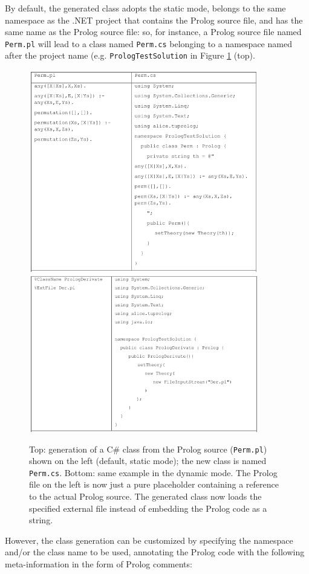 By default, the generated class adopts the static mode, belongs to the same namespace as the .NET project that contains the Prolog source file, and has the same name as the Prolog source file: so, for instance, a Prolog source file named \texttt{Perm.pl} will lead to a class named \texttt{Perm.cs} belonging to a namespace named after the project name (e.g. \texttt{PrologTestSolution} in Figure \ref{fig:dotnet-codegen1and2} (top).
%
\begin{figure}\center
  \includegraphics[width=10cm]{images/dotnet-codegen1}\\
  \includegraphics[width=10cm]{images/dotnet-codegen2}
  \caption{Top: generation of a C\# class from the Prolog source (\texttt{Perm.pl}) shown on the left (default, static mode); the new class is named \texttt{Perm.cs}.
  Bottom: same example in the dynamic mode. The Prolog file on the left is now just a pure placeholder containing a reference to the actual Prolog source. The generated class now loads the specified external file instead of embedding the Prolog code as a string.
  }\label{fig:dotnet-codegen1and2}
\end{figure}
%
However, the class generation can be customized by specifying the namespace and/or the class name to be used, annotating the Prolog code with the following meta-information in the form of Prolog comments:

